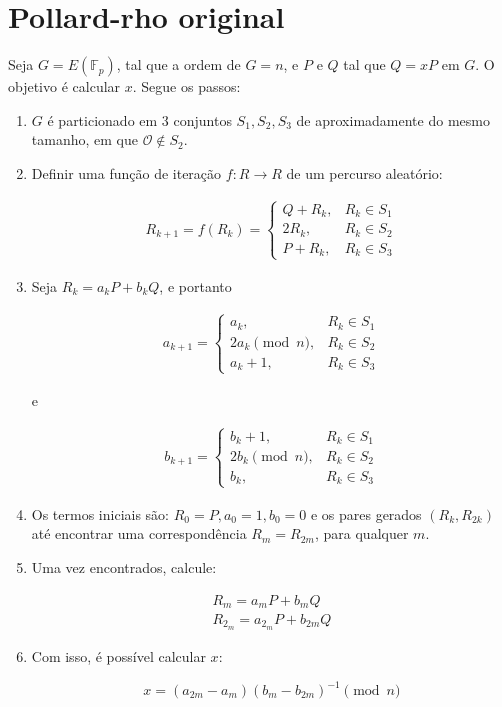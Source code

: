 \section{Pollard-rho original}
Seja $G = E(\mathbb{F}_p)$, tal que a ordem de $G = n$, e \(P\) e \(Q\) tal que $Q = xP$ em \(G\). O objetivo é calcular \(x\). Segue os passos:

\begin{enumerate}
\item \(G\) é particionado em 3 conjuntos $S_1, S_2, S_3$ de aproximadamente do mesmo tamanho, em que $\mathcal{O} \notin S_2$.
\item Definir uma função de iteração $f : R \to R$ de um percurso aleatório:

\begin{eqnarray} \label{eq:walk}
R_{k+1} = f(R_k) =
\begin{cases}
Q + R_k, &R_k \in S_1 \\
2R_k, &R_k \in S_2 \\
P + R_k, &R_k \in S_3
\end{cases}
\end{eqnarray}

\item Seja $R_k = a_kP + b_kQ$, e portanto

\begin{eqnarray}
a_{k+1} =
\begin{cases}
a_k, &R_k \in S_1 \\
2a_k \pmod n, &R_k \in S_2 \\
a_k + 1, &R_k \in S_3
\end{cases}
\end{eqnarray}

e

\begin{eqnarray}
b_{k+1} =
\begin{cases}
b_k + 1, &R_k \in S_1 \\
2b_k \pmod n, &R_k \in S_2 \\
b_k, &R_k \in S_3
\end{cases}
\end{eqnarray}

\item Os termos iniciais são: $R_0 = P, a_0 = 1, b_0 = 0$ e os pares gerados $(R_k, R_{2k})$ até encontrar uma correspondência $R_m = R_{2m}$, para qualquer \(m\).

\item Uma vez encontrados, calcule:

\begin{eqnarray*}
R_m = a_mP + b_mQ \\
R_{2_m} = a_{2_m}P + b_{2m}Q
\end{eqnarray*}

\item Com isso, é possível calcular \(x\):

\begin{equation} \label{eq:x}
x = (a_{2m} - a_m)(b_m - b_{2m})^{-1} \pmod n
\end{equation}

\end{enumerate}


